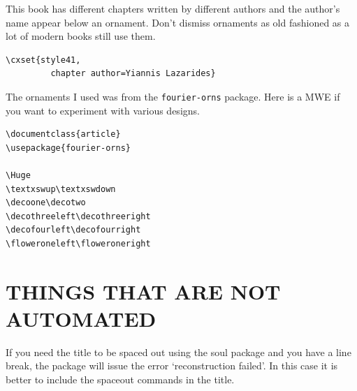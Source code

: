 \begin{figure}[ht]
\centering
{}
\end{figure}

This book has different chapters written by different authors and the author's name appear below an ornament. Don't dismiss ornaments as old fashioned as a lot of modern books still use them.

\begin{lstlisting}
\cxset{style41,
         chapter author=Yiannis Lazarides}
\end{lstlisting}

The ornaments I used was from the \texttt{fourier-orns} package. Here is a MWE if you want to experiment with various designs.


\begin{lstlisting}
\documentclass{article}
\usepackage{fourier-orns}

\Huge
\textxswup\textxswdown
\decoone\decotwo
\decothreeleft\decothreeright
\decofourleft\decofourright
\floweroneleft\floweroneright

\end{lstlisting}

\section{THINGS THAT ARE NOT AUTOMATED}

If you need the title to be spaced out using the soul package and you have a line break, the package will issue the error `reconstruction failed'. In this case it is better to include the spaceout commands in the title.


